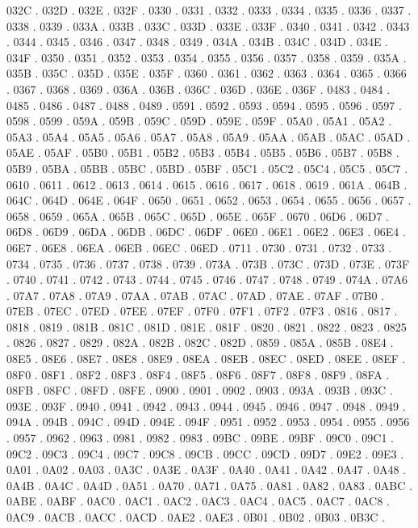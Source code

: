 032C .
032D .
032E .
032F .
0330 .
0331 .
0332 .
0333 .
0334 .
0335 .
0336 .
0337 .
0338 .
0339 .
033A .
033B .
033C .
033D .
033E .
033F .
0340 .
0341 .
0342 .
0343 .
0344 .
0345 .
0346 .
0347 .
0348 .
0349 .
034A .
034B .
034C .
034D .
034E .
034F .
0350 .
0351 .
0352 .
0353 .
0354 .
0355 .
0356 .
0357 .
0358 .
0359 .
035A .
035B .
035C .
035D .
035E .
035F .
0360 .
0361 .
0362 .
0363 .
0364 .
0365 .
0366 .
0367 .
0368 .
0369 .
036A .
036B .
036C .
036D .
036E .
036F .
0483 .
0484 .
0485 .
0486 .
0487 .
0488 .
0489 .
0591 .
0592 .
0593 .
0594 .
0595 .
0596 .
0597 .
0598 .
0599 .
059A .
059B .
059C .
059D .
059E .
059F .
05A0 .
05A1 .
05A2 .
05A3 .
05A4 .
05A5 .
05A6 .
05A7 .
05A8 .
05A9 .
05AA .
05AB .
05AC .
05AD .
05AE .
05AF .
05B0 .
05B1 .
05B2 .
05B3 .
05B4 .
05B5 .
05B6 .
05B7 .
05B8 .
05B9 .
05BA .
05BB .
05BC .
05BD .
05BF .
05C1 .
05C2 .
05C4 .
05C5 .
05C7 .
0610 .
0611 .
0612 .
0613 .
0614 .
0615 .
0616 .
0617 .
0618 .
0619 .
061A .
064B .
064C .
064D .
064E .
064F .
0650 .
0651 .
0652 .
0653 .
0654 .
0655 .
0656 .
0657 .
0658 .
0659 .
065A .
065B .
065C .
065D .
065E .
065F .
0670 .
06D6 .
06D7 .
06D8 .
06D9 .
06DA .
06DB .
06DC .
06DF .
06E0 .
06E1 .
06E2 .
06E3 .
06E4 .
06E7 .
06E8 .
06EA .
06EB .
06EC .
06ED .
0711 .
0730 .
0731 .
0732 .
0733 .
0734 .
0735 .
0736 .
0737 .
0738 .
0739 .
073A .
073B .
073C .
073D .
073E .
073F .
0740 .
0741 .
0742 .
0743 .
0744 .
0745 .
0746 .
0747 .
0748 .
0749 .
074A .
07A6 .
07A7 .
07A8 .
07A9 .
07AA .
07AB .
07AC .
07AD .
07AE .
07AF .
07B0 .
07EB .
07EC .
07ED .
07EE .
07EF .
07F0 .
07F1 .
07F2 .
07F3 .
0816 .
0817 .
0818 .
0819 .
081B .
081C .
081D .
081E .
081F .
0820 .
0821 .
0822 .
0823 .
0825 .
0826 .
0827 .
0829 .
082A .
082B .
082C .
082D .
0859 .
085A .
085B .
08E4 .
08E5 .
08E6 .
08E7 .
08E8 .
08E9 .
08EA .
08EB .
08EC .
08ED .
08EE .
08EF .
08F0 .
08F1 .
08F2 .
08F3 .
08F4 .
08F5 .
08F6 .
08F7 .
08F8 .
08F9 .
08FA .
08FB .
08FC .
08FD .
08FE .
0900 .
0901 .
0902 .
0903 .
093A .
093B .
093C .
093E .
093F .
0940 .
0941 .
0942 .
0943 .
0944 .
0945 .
0946 .
0947 .
0948 .
0949 .
094A .
094B .
094C .
094D .
094E .
094F .
0951 .
0952 .
0953 .
0954 .
0955 .
0956 .
0957 .
0962 .
0963 .
0981 .
0982 .
0983 .
09BC .
09BE .
09BF .
09C0 .
09C1 .
09C2 .
09C3 .
09C4 .
09C7 .
09C8 .
09CB .
09CC .
09CD .
09D7 .
09E2 .
09E3 .
0A01 .
0A02 .
0A03 .
0A3C .
0A3E .
0A3F .
0A40 .
0A41 .
0A42 .
0A47 .
0A48 .
0A4B .
0A4C .
0A4D .
0A51 .
0A70 .
0A71 .
0A75 .
0A81 .
0A82 .
0A83 .
0ABC .
0ABE .
0ABF .
0AC0 .
0AC1 .
0AC2 .
0AC3 .
0AC4 .
0AC5 .
0AC7 .
0AC8 .
0AC9 .
0ACB .
0ACC .
0ACD .
0AE2 .
0AE3 .
0B01 .
0B02 .
0B03 .
0B3C .
